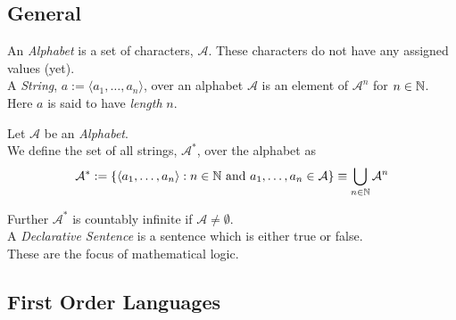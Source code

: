 \documentclass[11pt,a4paper]{article}
\begin{document}
\subsection{General}

An \textit{Alphabet} is a set of characters, $\mathcal{A}$. These characters do not have any assigned values (yet).\\

A \textit{String}, $a:=\langle a_1,\dots,a_n\rangle$, over an alphabet $\mathcal{A}$ is an element of $\mathcal{A}^n$ for $n\in\mathbb{N}$.\\
Here $a$ is said to have \textit{length} $n$.\\


Let $\mathcal{A}$ be an \textit{Alphabet}.\\
We define the set of all strings, $\mathcal{A}^*$, over the alphabet as
$$\mathcal{A}^*:=\{\langle a_1,\dots,a_n\rangle:n\in\mathbb{N}\text{ and }a_1,\dots,a_n\in\mathcal{A}\}\equiv\bigcup\limits_{n\in\mathbb{N}}\mathcal{A}^n$$

Further $\mathcal{A}^*$ is countably infinite if $\mathcal{A}\neq\emptyset$.\\

A \textit{Declarative Sentence} is a sentence which is either true or false.\\
\nb These are the focus of mathematical logic.\\

\subsection{First Order Languages}
\end{document}
